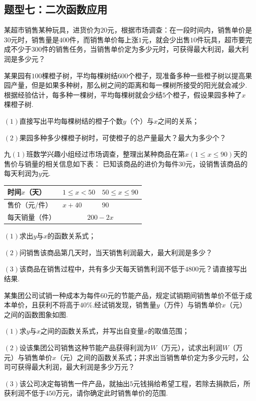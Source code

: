 \documentclass[10pt]{ctexart}
\begin{document}
\subsection{题型七：二次函数应用}
\begin{dkyi}{}{}
某超市销售某种玩具，进货价为$20$元，根据市场调查：在一段时间内，销售单价是$30$元时，销售量是$400$件，而销售单价每上涨$1$元，就会少出售$10$件玩具，超市要完成不少于$300$件的销售任务，当销售单价定为多少元时，可获得最大利润，最大利润是多少元？
\end{dkyi}
\begin{dkyi}{}{}
 某果园有$100$棵橙子树，平均每棵树结$600$个橙子，现准备多种一些橙子树以提高果园产量，但是如果多种树，那么树之间的距离和每一棵树所接受的阳光就会减少.根据经验估计，每多种一棵树，平均每棵树就会少结$5$个橙子，假设果园多种了$x$棵橙子树.
 
 $(1)$直接写出平均每棵树结的橙子个数$y$（个）与$x$之间的关系；
 
 $(2)$果园多种多少棵橙子树时，可使橙子的总产量最大？最大为多少个？
\end{dkyi}
\begin{jply}{}{}
 九$(1)$班数学兴趣小组经过市场调查，整理出某种商品在第$x(1\leq x\leq 90)$天的售价与销量的相关信息如下表：
 已知该商品的进价为每件$30$元，设销售该商品的每天利润为$y$元.
  

 \begin{tabular}{|p{3cm} |p{4cm}|p{4cm}|}
 \hline
 时间$x$（天）&$1\leq x<50$&$50\leq x\leq 90$\\ \hline
 售价（元/件）&$x+40$&$90$\\ \hline
 每天销量（件）& \multicolumn{2}{c|}{$200-2x$}\\ \hline
 \end{tabular}

 
 $(1)$求出$y$与$x$的函数关系式；
 
 $(2)$问销售该商品第几天时，当天销售利润最大，最大利润是多少？
 
 $(3)$该商品在销售过程中，共有多少天每天销售利润不低于$4800$元？请直接写出结果.
\end{jply}
\begin{jply}{}{}
某集团公司试销一种成本为每件$60$元的节能产品，规定试销期间销售单价不低于成本单价，且获利不将高于$40\%$.经试销发现，销售量$y$（万件）与销售单价$x$（元）之间的函数图象如图.

  $(1)$求$y$与$x$之间的函数关系式，并写出自变量$x$的取值范围；
 
 $(2)$设该集团公司销售这种节能产品获得利润为$W$（万元），试求出利润$W$（万元）与销售单价$x$（元）之间的函数关系式；并求出当销售单价定为多少元时，公司可获得最大利润，最大利润是多少万元？
 
 $(3)$该公司决定每销售一件产品，就抽出$5$元钱捐给希望工程，若除去捐款后，所获利润不低于$450$万元，请你确定此时销售单价的范围.
 \end{jply}
\end{document}
